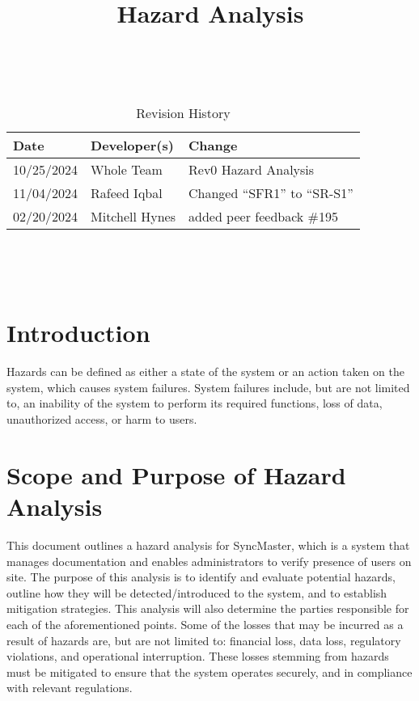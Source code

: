 \documentclass{article}
\title{Hazard Analysis\\\progname}
\author{\authname}
\date{}
\begin{document}
\maketitle
\thispagestyle{empty}

~\newpage


\begin{table}[hp]
  \caption{Revision History} \label{TblRevisionHistory}
  \begin{tabularx}{\textwidth}{llX}
    \toprule
    \textbf{Date} & \textbf{Developer(s)} & \textbf{Change}\\
    \midrule
    10/25/2024 & Whole Team & Rev0 Hazard Analysis\\
    11/04/2024 & Rafeed Iqbal & Changed ``SFR1'' to ``SR-S1''\\
    02/20/2024 & Mitchell Hynes & added peer feedback \#195\\
    \bottomrule
  \end{tabularx}
\end{table}

~\newpage

\tableofcontents

\listoftables

~\newpage


\section{Introduction}

Hazards can be defined as either a state of the system or an action
taken on the system, which causes system failures. System failures
include, but are not limited to, an inability of the system to
perform its required functions, loss of data, unauthorized access,
or harm to users.

\section{Scope and Purpose of Hazard Analysis}

This document outlines a hazard analysis for SyncMaster, which is a system that
manages documentation and enables administrators to verify presence of users on
site. The purpose of this analysis is to identify and evaluate potential
hazards, outline how they will be detected/introduced to the system, and to
establish mitigation strategies. This analysis will also determine
the parties responsible
for each of the aforementioned points. Some of the losses that
may be incurred as a result of hazards are, but are not limited to:
financial loss, data loss, regulatory violations, and
operational interruption. These losses stemming from hazards must be mitigated
to ensure that the system operates securely, and in compliance with relevant
regulations.\\
\end{document}
